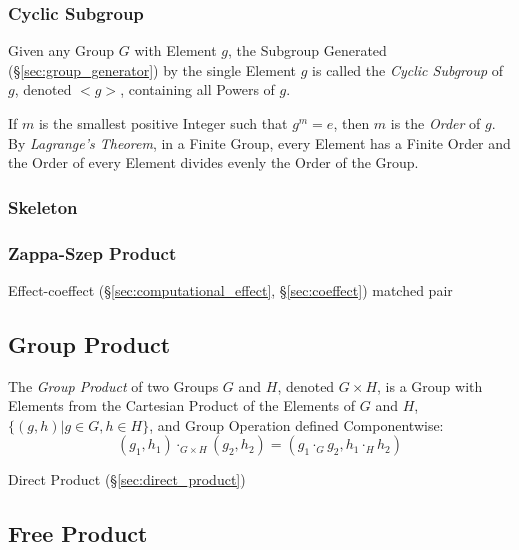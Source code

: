 \subsubsection{Cyclic Subgroup}\label{sec:cyclic_subgroup}

Given any Group $G$ with Element $g$, the Subgroup Generated
(\S\ref{sec:group_generator}) by the single Element $g$ is called the
\emph{Cyclic Subgroup} of $g$, denoted $<g>$, containing all Powers of
$g$.

If $m$ is the smallest positive Integer such that $g^m = e$, then $m$
is the \emph{Order} of $g$. By \emph{Lagrange's Theorem}, in a Finite
Group, every Element has a Finite Order and the Order of every Element
divides evenly the Order of the Group.



\subsubsection{Skeleton}\label{sec:group_skeleton}

\subsubsection{Zappa-Szep Product}\label{sec:zappa_szep}

Effect-coeffect (\S\ref{sec:computational_effect},
\S\ref{sec:coeffect}) matched pair



\subsection{Group Product}\label{sec:group_product}

The \emph{Group Product} of two Groups $G$ and $H$, denoted $G \times
H$, is a Group with Elements from the Cartesian Product of the
Elements of $G$ and $H$, $\{(g,h) | g \in G, h \in H\}$, and Group
Operation defined Componentwise:
\[
    (g_1, h_1) \cdot_{G \times H} (g_2, h_2)
    = (g_1 \cdot_G g_2, h_1 \cdot_H h_2)
\]

Direct Product (\S\ref{sec:direct_product})



\subsection{Free Product}\label{sec:free_product}

